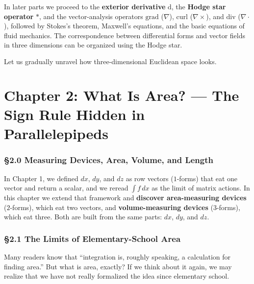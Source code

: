 \documentclass[a4paper,12pt,openany]{book}
\begin{document}
In later parts we proceed to the \textbf{exterior derivative}
\(\mathrm{d}\), the \textbf{Hodge star operator} \(\ast\), and the
vector-analysis operators \(\mathrm{grad}\) (\(\nabla\)),
\(\mathrm{curl}\) (\(\nabla\times\)), and \(\mathrm{div}\)
(\(\nabla\cdot\)), followed by Stokes's theorem, Maxwell's equations,
and the basic equations of fluid mechanics. The correspondence between
differential forms and vector fields in three dimensions can be
organized using the Hodge star.

Let us gradually unravel how three-dimensional Euclidean space looks.

\newpage

\hypertarget{chapter-2-what-is-area-the-sign-rule-hidden-in-parallelepipeds}{%
\chapter{Chapter 2: What Is Area? — The Sign Rule Hidden in
Parallelepipeds}\label{chapter-2-what-is-area-the-sign-rule-hidden-in-parallelepipeds}}

\hypertarget{measuring-devices-area-volume-and-length}{%
\subsection{§2.0 Measuring Devices, Area, Volume, and
Length}\label{measuring-devices-area-volume-and-length}}

In Chapter 1, we defined \(dx\), \(dy\), and \(dz\) as row vectors
(\(1\)-forms) that eat one vector and return a scalar, and we reread
\(\int f\,dx\) as the limit of matrix actions. In this chapter we extend
that framework and \textbf{discover area-measuring devices}
(\(2\)-forms), which eat two vectors, and
\textbf{volume-measuring devices} (\(3\)-forms), which eat three. Both
are built from the same parts: \(dx\), \(dy\), and \(dz\).

\par\vspace{0.35em}\par

\hypertarget{the-limits-of-elementary-school-area}{%
\subsection{§2.1 The Limits of Elementary-School
Area}\label{the-limits-of-elementary-school-area}}

Many readers know that ``integration is, roughly speaking, a calculation
for finding area.'' But what is area, exactly? If we think about it
again, we may realize that we have not really formalized the idea since
elementary school.
\end{document}
